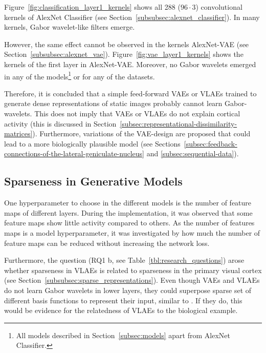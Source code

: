 Figure~\ref{fig:classification_layer1_kernels} shows all 288 ($96 \cdot 3$) convolutional kernels of AlexNet Classifier (see Section~\ref{subsubsec:alexnet_classifier}).
In many kernels, Gabor wavelet-like filters emerge.

However, the same effect cannot be observed in the kernels AlexNet-\ac{VAE} (see Section~\ref{subsubsec:alexnet_vae}).
Figure~\ref{fig:vae_layer1_kernels} shows the kernels of the first layer in AlexNet-\ac{VAE}.
Moreover, no Gabor wavelets emerged in any of the models\footnote{All models described in Section~\ref{subsec:models} apart from AlexNet Classifier.} or for any of the datasets.

Therefore, it is concluded that a simple feed-forward \acp{VAE} or \acp{VLAE} trained to generate dense representations of static images probably cannot learn Gabor-wavelets.
This does not imply that \acp{VAE} or \acp{VLAE} do not explain cortical activity (this is discussed in Section~\ref{subsec:representational-dissimilarity-matrices}).
Furthermore, variations of the \ac{VAE}-design are proposed that could lead to a more biologically plausible model (see Sections~\ref{subsec:feedback-connections-of-the-lateral-geniculate-nucleus} and \ref{subsec:sequential-data}).


\subsection{Sparseness in Generative Models}\label{subsec:effective-network-capacity}
One hyperparameter to choose in the different models is the number of feature maps of different layers.
During the implementation, it was observed that some feature maps show little activity compared to others.
As the number of features maps is a model hyperparameter, it was investigated by how much the number of feature maps can be reduced without increasing the network loss.

Furthermore, the question (RQ1 b, see Table~\ref{tbl:research_questions}) arose whether sparseness in \acp{VLAE} is related to sparseness in the primary visual cortex (see Section~\ref{subsubsec:sparse_representations}).
Even though \acp{VAE} and \acp{VLAE} do not learn Gabor wavelets in lower layers, they could superpose sparse set of different basis functions to represent their input, similar to \citet{Olshausen1996}.
If they do, this would be evidence for the relatedness of \acp{VLAE} to the biological example.

